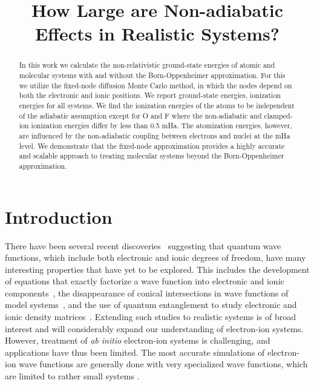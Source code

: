 \documentclass[pra,superscriptaddress,groupedaddress,twocolumn]{revtex4}
\begin{document}
\title{How Large are Non-adiabatic Effects in Realistic Systems?}

\begin{abstract}
In this work we calculate the non-relativistic ground-state energies of atomic and molecular systems with and without the Born-Oppenheimer approximation. For this we utilize the fixed-node diffusion Monte Carlo method, in which the nodes depend on both the electronic and ionic positions. We report ground-state energies, ionization energies for all systems. We find the ionization energies of the atoms to be independent of the adiabatic assumption except for O and F where the non-adiabatic and clamped-ion ionization energies differ by less than 0.5 mHa. The atomization energies, however, are influenced by the non-adiabatic coupling between electrons and nuclei at the mHa level. We demonstrate that the fixed-node approximation provides a highly accurate and scalable approach to treating molecular systems beyond the Born-Oppenheimer approximation.
\end{abstract}
\maketitle

\section{Introduction}
There have been several recent discoveries~\cite{cederbaum1,gross2014,boent} suggesting that quantum wave functions, which include both electronic and ionic degrees of freedom, have many interesting properties that have yet to be explored.  This includes the development of equations that exactly factorize a wave function into electronic and ionic components~\cite{cederbaum1}, the disappearance of conical intersections in wave functions of model systems~\cite{gross2014}, and the use of quantum entanglement to study electronic and ionic density matrices~\cite{boent}. Extending such studies to realistic systems is of broad interest and will considerably expand our understanding of electron-ion systems. However, treatment of \textit{ab initio} electron-ion systems is challenging, and applications have thus been limited. The most accurate simulations of electron-ion wave functions are generally done with very specialized wave functions, which are limited to rather small systems \cite{mitroy2013}.  
\end{document}
